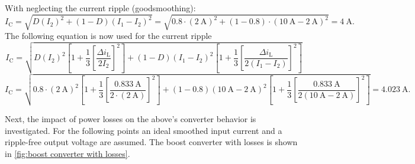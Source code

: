 \begin{solutionblock}
\begin{equation}
     \end{equation}
     With neglecting the current ripple (goodsmoothing):
     \begin{equation}
        I_\mathrm{C}=\sqrt{D (I_\mathrm{2})^2+(1-D)(I_\mathrm{1}-I_\mathrm{2})^2}=\sqrt{0.8\cdot (\SI{2}{\ampere})^2+(1-0.8)\cdot(\SI{10}{\ampere}-\SI{2}{\ampere})^2} = \SI{4}{\ampere}.
     \end{equation}
     The following equation is now used for the current ripple
     \begin{equation}
        I_\mathrm{C}=\sqrt{D (I_\mathrm{2})^2\left[1+\frac{1}{3}\left[\frac{\Delta i_\mathrm{L}}{2I_\mathrm{2}}\right]^2\right]+(1-D)(I_\mathrm{1}-I_\mathrm{2})^2\left[1+\frac{1}{3}\left[\frac{\Delta i_\mathrm{L}}{2(I_\mathrm{1}-I_\mathrm{2})}\right]^2\right]}
    \end{equation}
    \begin{equation}
        I_\mathrm{C}=\sqrt{0.8 \cdot (\SI{2}{\ampere})^2 \left[1+\frac{1}{3}\left[\frac{\SI{0.833}{\ampere}}{2\cdot (\SI{2}{\ampere})}\right]^2\right]+(1-0.8)(\SI{10}{\ampere}- \SI{2}{\ampere})^2\left[1+\frac{1}{3}\left[\frac{\SI{0.833}{\ampere}}{2(\SI{10}{\ampere}- \SI{2}{\ampere})}\right]^2\right]}=\SI{4.023}{\ampere}.
    \end{equation}
\end{solutionblock}

Next, the impact of power losses on the above's converter behavior is investigated. For the following points an ideal smoothed input current and a ripple-free output voltage are assumed. The boost converter with losses  is shown in \autoref{fig:boost converter with losses}.



